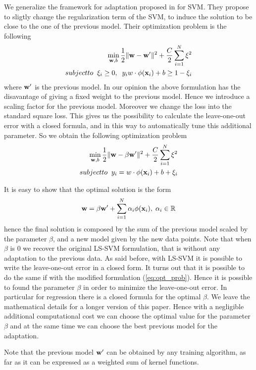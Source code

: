 We generalize the framework for adaptation proposed in \cite{YangYH07} for
SVM. They propose to sligtly change the regularization term of the SVM, to
induce the solution to be close to the one of the previous model. Their 
optimization problem is the following
\begin{align}
\min_{\ww,b} \frac{1}{2} \|\ww- \ww'\|^2 + \frac{C}{2} \sum_{i=1}^N \xi^2 \\
\mbox{subject to} \;\; \xi_i \geq 0,\;\; y_i w \cdot \phi(\xx_i) + b \geq 1-\xi_i
\label{eq:opt_prob_orig}
\end{align}
\noindent where $\mathbf{w}'$ is the previous model.
In our opinion the above formulation has the disavantage of giving a fixed
weight to the previous model. Hence we introduce a scaling factor for the previous
model. Moreover we change the loss into the standard square loss. This gives
us the possibility to calculate the leave-one-out error with a closed formula, and
in this way to automatically tune this additional parameter.
So we obtain the following optimization problem
\begin{align}
\min_{\ww,b} \frac{1}{2} \|\ww- \beta \ww'\|^2 + \frac{C}{2} \sum_{i=1}^N \xi^2 \\
\mbox{subject to} \;\; y_i = w \cdot \phi(\xx_i) + b + \xi_i
\label{eq:opt_prob}
\end{align}

It is easy to show that the optimal solution is the form
\begin{equation}
\mathbf{w} = \beta \mathbf{w}' + \sum_{i=1}^N \alpha_i \phi(\mathbf{x}_i), \; \alpha_i \in \mathbb{R}
\end{equation}
\noindent hence the final solution is composed by the sum of the previous model
scaled by the parameter $\beta$, and a new model given by the new data points.
Note that when $\beta$ is $0$ we recover the original LS-SVM formulation, that is without any
adaptation to the previous data.
As said before, with LS-SVM it is possible to write the leave-one-out error
in a closed form. It turns out that it is possible to do the same if with the
modified formulation (\ref{eq:opt_prob}). Hence it is possible to found the
parameter $\beta$ in order to minimize the leave-one-out error. In particular
for regression there is a closed formula for the optimal $\beta$. We leave the
mathematical details for a longer version of this paper.
Hence with a negligible additional computational cost we can choose the optimal
value for the parameter $\beta$ and at the same time we can choose the best
previous model for the adaptation.

Note that the previous model $\mathbf{w}'$ can be obtained by any training algorithm,
as far as it can be expressed as a weighted sum of kernel functions.